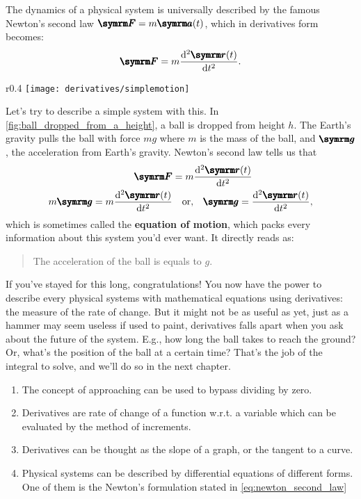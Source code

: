 The dynamics of a physical system is universally described by the famous Newton's second law $\vv{F} = m\vv{a}(t)$, which in derivatives form becomes:
\begin{equation}
    \vv{F} = m\odv[ord = 2]{\vv{r}(t)}{t}. \label{eq:newton_second_law}
\end{equation}
\begin{wrapfigure}[11]{r}{0.4\textwidth}
    \centering
    \texttt{[image: derivatives/simplemotion]}
    \caption{A ball dropped from height $h$}
    \label{fig:ball_dropped_from_a_height}
\end{wrapfigure}
Let's try to describe a simple system with this. In \cref{fig:ball_dropped_from_a_height}, a ball is dropped from height $h$. The Earth's gravity pulls the ball with force $mg$ where $m$ is the mass of the ball, and $\vv{g}$, the acceleration from Earth's gravity. Newton's second law tells us that
\begin{align}
    \vv{F} &= m\odv[ord = 2]{\vv{r}(t)}{t} \nonumber\\
    m\vv{g} = m\odv[ord = 2]{\vv{r}(t)}{t} &\quad \textrm{or,} \quad \vv{g} = \odv[ord = 2]{\vv{r}(t)}{t},
\end{align}
which is sometimes called the \textbf{equation of motion}, which packs every information about this system you'd ever want. It directly reads as:
\begin{quotation}
    The acceleration of the ball is equals to $g$.
\end{quotation}
If you've stayed for this long, congratulations! You now have the power to describe every physical systems with mathematical equations using derivatives: the measure of the rate of change. But it might not be as useful as yet, just as a hammer may seem useless if used to paint, derivatives falls apart when you ask about the future of the system. E.g., how long the ball takes to reach the ground? Or, what's the position of the ball at a certain time? That's the job of the integral to solve, and we'll do so in the next chapter.

\conclusion

\begin{enumerate}[noitemsep]
    \item The concept of approaching can be used to bypass dividing by zero.
    \item Derivatives are rate of change of a function w.r.t. a variable which can be evaluated by the method of increments.
    \item Derivatives can be thought as the slope of a graph, or the tangent to a curve.
    \item Physical systems can be described by differential equations of different forms. One of them is the Newton's formulation stated in \cref{eq:newton_second_law}
\end{enumerate}

